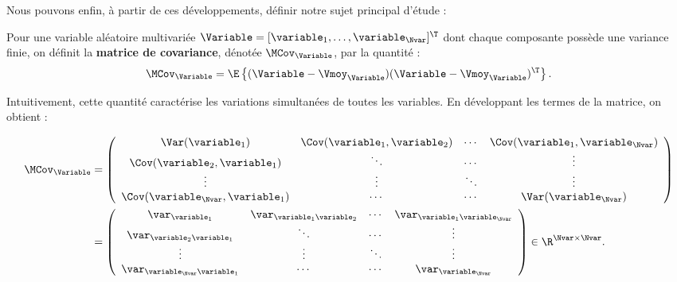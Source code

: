 Nous pouvons enfin, à partir de ces développements, définir notre sujet
principal d'étude :

\begin{definition}
\label{def:context-definition-covariance-matrix}
  Pour une variable aléatoire multivariée
  $\Variable=[\variable_1,\dots,\variable_\Nvar]^\T$ dont chaque
  composante possède une variance finie, on définit la
  \textbf{matrice de covariance}, dénotée $\MCov_\Variable$, par la
  quantité :
\begin{equation}
  \MCov_\Variable
  =
  \E\left\{
    (\Variable-\Vmoy_\Variable)
    (\Variable-\Vmoy_\Variable)^\T
  \right\}.
  \label{eq:context-definition-matricecovariance}
\end{equation}
\end{definition}


Intuitivement, cette quantité caractérise les variations simultanées
de toutes les variables. En développant les termes de la matrice, on
obtient :

\begin{equation}
\begin{aligned}
  \MCov_\Variable
  &=
  \left(
  \begin{array}{cccc}
    \Var(\variable_1)
    & \Cov(\variable_1,\variable_2)
    & \cdots
    & \Cov(\variable_1,\variable_\Nvar)
    \\
    \Cov(\variable_2,\variable_1)
    & \ddots
    & \cdots
    & \vdots
    \\
    \vdots
    & \vdots
    & \ddots
    & \vdots
    \\
    \Cov(\variable_\Nvar,\variable_1)
    & \cdots
    & \cdots
    & \Var(\variable_\Nvar)
  \end{array}
  \right)
  \\
  &=
  \left(
  \begin{array}{cccc}
    \var_{\variable_1}
    & \var_{\variable_1\variable_2}
    & \cdots
    & \var_{\variable_1\variable_\Nvar}
    \\
    \var_{\variable_2\variable_1}
    & \ddots
    & \cdots
    & \vdots
    \\
    \vdots
    & \vdots
    & \ddots
    & \vdots
    \\
    \var_{\variable_\Nvar\variable_1}
    & \cdots
    & \cdots
    & \var_{\variable_\Nvar}
  \end{array}
  \right)
  \in\R^{\Nvar\times\Nvar}.
\end{aligned}
\end{equation}

